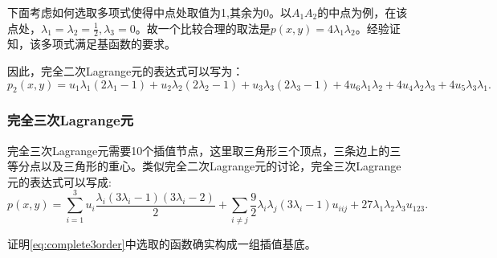下面考虑如何选取多项式使得中点处取值为1,其余为0。以$A_{1}A_{2}$的中点为例，在该点处，$\lambda_{1}=\lambda_{2}=\frac{1}{2},\lambda_{3}=0$。故一个比较合理的取法是$p(x,y)=4\lambda_{1}\lambda_{2}$。经验证知，该多项式满足基函数的要求。

因此，完全二次Lagrange元的表达式可以写为：
\begin{equation}
    p_{2}(x,y)=u_{1}\lambda_{1}(2\lambda_{1}-1)+u_{2}\lambda_{2}(2\lambda_{2}-1)+u_{3}\lambda_{3}(2\lambda_{3}-1)+4u_{6}\lambda_{1}\lambda_{2}+4u_{4}\lambda_{2}\lambda_{3}+4u_{5}\lambda_{3}\lambda_{1}.
\end{equation}
\subsubsection{完全三次Lagrange元}
完全三次Lagrange元需要10个插值节点，这里取三角形三个顶点，三条边上的三等分点以及三角形的重心。类似完全二次Lagrange元的讨论，完全三次Lagrange元的表达式可以写成:
\begin{equation}
    \label{eq:complete3order}
    p(x,y)=\sum_{i=1}^{3}u_{i}\frac{\lambda_{i}(3\lambda_{i}-1)(3\lambda_{i}-2)}{2}+\sum_{i\neq j}\frac{9}{2}\lambda_{i}\lambda_{j}(3\lambda_{i}-1)u_{iij}+27\lambda_{1}\lambda_{2}\lambda_{3}u_{123}.
\end{equation}
\begin{exercise}
    证明\eqref{eq:complete3order}中选取的函数确实构成一组插值基底。
\end{exercise}
